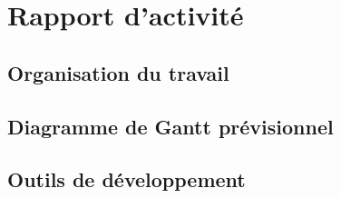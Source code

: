 \section{Rapport d'activité}

\subsection{Organisation du travail}


\subsection{Diagramme de Gantt prévisionnel}


\subsection{Outils de développement}

